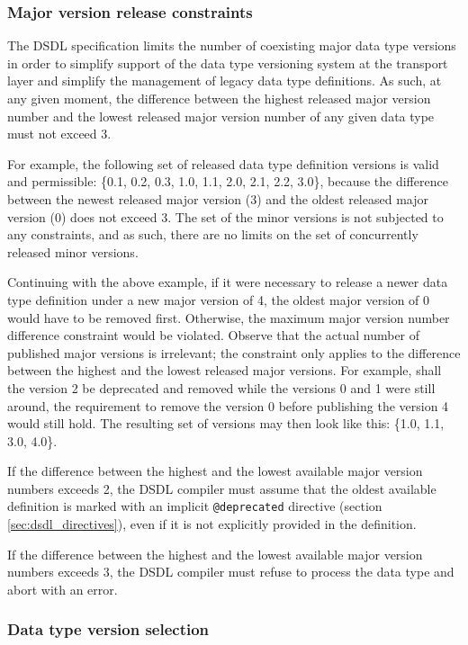 \subsubsection{Major version release constraints}

The DSDL specification limits the number of coexisting major data type versions
in order to simplify support of the data type versioning system at the transport layer
and simplify the management of legacy data type definitions.
As such, at any given moment, the difference between the highest released major version number
and the lowest released major version number of any given data type must not exceed 3.

For example, the following set of released data type definition versions is valid and permissible:
\{0.1, 0.2, 0.3, 1.0, 1.1, 2.0, 2.1, 2.2, 3.0\},
because the difference between the newest released major version (3) and the oldest released major version (0)
does not exceed 3.
The set of the minor versions is not subjected to any constraints,
and as such, there are no limits on the set of concurrently released minor versions.

Continuing with the above example, if it were necessary to release a newer data type definition
under a new major version of 4, the oldest major version of 0 would have to be removed first.
Otherwise, the maximum major version number difference constraint would be violated.
Observe that the actual number of published major versions is irrelevant;
the constraint only applies to the difference between the highest and the lowest released major versions.
For example, shall the version 2 be deprecated and removed while the versions 0 and 1 were still around,
the requirement to remove the version 0 before publishing the version 4 would still hold.
The resulting set of versions may then look like this:
\{1.0, 1.1, 3.0, 4.0\}.

If the difference between the highest and the lowest available major version numbers exceeds 2,
the DSDL compiler must assume that the oldest available definition is marked with an implicit
\verb|@deprecated| directive (section \ref{sec:dsdl_directives}),
even if it is not explicitly provided in the definition.

If the difference between the highest and the lowest available major version numbers exceeds 3,
the DSDL compiler must refuse to process the data type and abort with an error.

\subsubsection{Data type version selection}

